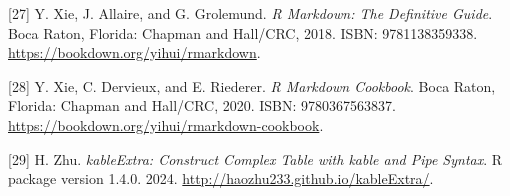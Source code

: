 \documentclass[
  12pt,
]{article}
\begin{document}
{[}27{]} Y. Xie, J. Allaire, and G. Grolemund. \emph{R Markdown: The Definitive
Guide}. Boca Raton, Florida: Chapman and Hall/CRC, 2018. ISBN:
9781138359338. \url{https://bookdown.org/yihui/rmarkdown}.

{[}28{]} Y. Xie, C. Dervieux, and E. Riederer. \emph{R Markdown Cookbook}. Boca
Raton, Florida: Chapman and Hall/CRC, 2020. ISBN: 9780367563837.
\url{https://bookdown.org/yihui/rmarkdown-cookbook}.

{[}29{]} H. Zhu. \emph{kableExtra: Construct Complex Table with kable and Pipe
Syntax}. R package version 1.4.0. 2024.
\url{http://haozhu233.github.io/kableExtra/}.
\end{document}
